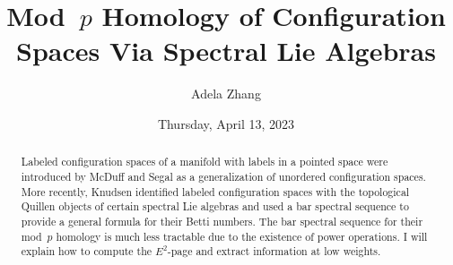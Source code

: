\documentclass{UAmathtalk}
\author{Adela Zhang}
\title{Mod~$p$ Homology of Configuration Spaces Via Spectral Lie Algebras}
\date{Thursday, April 13, 2023}
\begin{document}
\maketitle

\begin{abstract}
Labeled configuration spaces of a manifold with labels in a pointed space were introduced by McDuff and Segal as a generalization of unordered configuration spaces. More recently, Knudsen identified labeled configuration spaces with the topological Quillen objects of certain spectral Lie algebras and used a bar spectral sequence to provide a general formula for their Betti numbers. The bar spectral sequence for their mod~$p$ homology is much less tractable due to the existence of power operations. I will explain how to compute the $E^2$-page and extract information at low weights.
\end{abstract}
\end{document}
